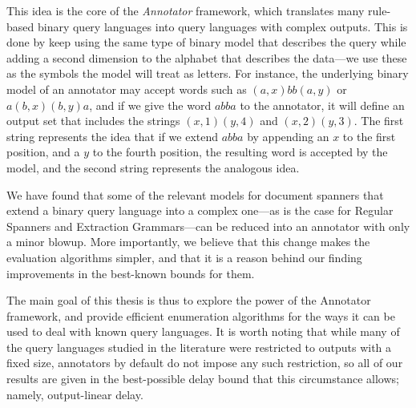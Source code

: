 This idea is the core of the {\it Annotator} framework, which translates many rule-based binary query languages into query languages with complex outputs. This is done by keep using the same type of binary model that describes the query while adding a second dimension to the alphabet that describes the data---we use these as the symbols the model will treat as letters. For instance, the underlying binary model of an annotator may accept words such as  $(a,x)bb(a,y)$ or $a(b,x)(b,y)a$, and if we give the word $abba$ to the annotator, it will define an output set that includes the strings $(x,1)(y,4)$ and $(x,2)(y,3)$. The first string represents the idea that if we extend $abba$ by appending an $x$ to the first position, and a $y$ to the fourth position, the resulting word is accepted by the model, and the second string  represents the analogous idea.

We have found that some of the relevant models for document spanners that extend a binary query language into a complex one---as is the case for Regular Spanners and Extraction Grammars---can be reduced into an annotator with only a minor blowup. More importantly, we believe that this change makes the evaluation algorithms simpler, and that it is a reason behind our finding improvements in the best-known bounds for them.

The main goal of this thesis is thus to explore the power of the Annotator framework, and provide efficient enumeration algorithms for the ways it can be used to deal with known query languages. It is worth noting that while many of the query languages studied in the literature were restricted to outputs with a fixed size, annotators by default do not impose any such restriction, so all of our results are given in the best-possible delay bound that this circumstance allows; namely, output-linear delay.

